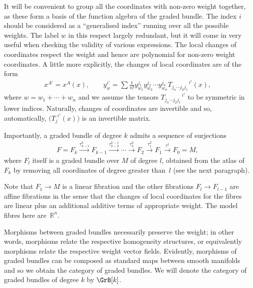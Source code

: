 It will be convenient to group all the coordinates with non-zero weight together, as these form a basis of the function algebra of the graded bundle. The index $i$ should be considered as a ``generalised index'' running over all the possible weights. The label $w$ in this respect largely redundant, but it will come in very useful when checking the validity of various expressions. The local changes of coordinates respect the weight and hence are polynomial for non-zero weight coordinates. A little more explicitly, the changes of local coordinates are of the form
\begin{gather*}
 x^{A'} = x^{A}(x), \qquad y^{i'}_{w} = \sum \frac{1}{n!} y^{j_{1}}_{w_{1}} y^{j_{2}}_{w_{2}} \cdots y^{j_{n}}_{w_{n}}T_{j_{n} \cdots j_{2} j_{1}}^{\:\:\:\:\:\:\:\:\:\:\:\: \:\:\:\: i'}(x), \end{gather*}
where $w=w_1+\cdots+w_n$ and we assume the tensors $T_{j_{n} \cdots j_{2} j_{1}}^{\:\:\:\:\:\:\:\:\:\:\:\: \:\:\:\: i'}$ to be symmetric in lower indices. Naturally, changes of coordinates are invertible and so, automatically, $\big(T_{j}^{\:\: i'}(x)\big)$ is an invertible matrix.

Importantly, a graded bundle of degree $k$ admits a sequence of surjections
\begin{gather}\label{eqn:fibrations}
F=F_{k} \stackrel{\tau^{k}_{k-1}}{\longrightarrow} F_{k-1} \stackrel{\tau^{k-1}_{k-2}}{\longrightarrow} \cdots \stackrel{\tau^{3}_2}{\longrightarrow} F_{2} \stackrel{\tau^{2}_1}{\longrightarrow}F_{1} \stackrel{\tau^{1}}{\longrightarrow} F_{0} = M,
\end{gather}
where $F_l$ itself is a graded bundle over $M$ of degree $l$, obtained from the atlas of $F_k$ by removing all coordinates of degree greater than~$l$ (see the next paragraph).

Note that $F_{1} \rightarrow M$ is a linear f\/ibration and the other f\/ibrations $F_{l} \rightarrow F_{l-1}$ are af\/f\/ine f\/ibrations in the sense that the changes of local coordinates for the f\/ibres are linear plus an additional additive terms of appropriate weight. The model f\/ibres here are~$\mathbb{R}^{n}$.

Morphisms between graded bundles necessarily preserve the weight; in other words, morphisms relate the respective homogeneity structures, or equivalently morphisms relate the respective weight vector f\/ields. Evidently, morphisms of graded bundles can be composed as standard maps between smooth manifolds and so we obtain the category of graded bundles. We will denote the category of graded bundles of degree $k$ by $\GrB[k]$.


